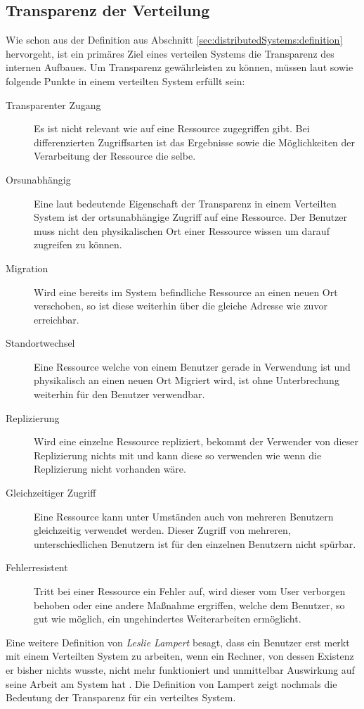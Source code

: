 \subsection{Transparenz der Verteilung}\label{sec:distributedSystems:goales:Transperency} Wie schon aus der Definition aus Abschnitt \ref{sec:distributedSystems:definition} hervorgeht, ist ein primäres Ziel eines verteilen Systems die Transparenz des internen Aufbaues. Um Transparenz gewährleisten zu können, müssen laut \cite{iec1995open} sowie \cite{tanenbaum2007distributed} folgende Punkte in einem verteilten System erfüllt sein:
\begin{description}
    \item[Transparenter Zugang] Es ist nicht relevant wie auf eine Ressource zugegriffen gibt. Bei differenzierten Zugriffsarten ist das Ergebnisse sowie die Möglichkeiten der Verarbeitung der Ressource die selbe. 
    \item[Orsunabhängig] Eine laut \cite{tanenbaum2007distributed} bedeutende Eigenschaft der Transparenz in einem Verteilten System ist der ortsunabhängige Zugriff auf eine Ressource. Der Benutzer muss nicht den physikalischen Ort einer Ressource wissen um darauf zugreifen zu können. 
    \item[Migration] Wird eine bereits im System befindliche Ressource an einen neuen Ort verschoben, so ist diese weiterhin über die gleiche Adresse wie zuvor erreichbar.
    \item [Standortwechsel] Eine Ressource welche von einem Benutzer gerade in Verwendung ist und physikalisch an einen neuen Ort Migriert wird, ist ohne Unterbrechung weiterhin für den Benutzer verwendbar.
    \item[Replizierung] Wird eine einzelne Ressource repliziert, bekommt der Verwender von dieser Replizierung nichts mit und kann diese so verwenden wie wenn die Replizierung nicht vorhanden wäre. 
    \item[Gleichzeitiger Zugriff] Eine Ressource kann unter Umständen auch von mehreren Benutzern gleichzeitig verwendet werden. Dieser Zugriff von mehreren, unterschiedlichen Benutzern ist für den einzelnen Benutzern nicht spürbar.
    \item[Fehlerresistent] Tritt bei einer Ressource ein Fehler auf, wird dieser vom User verborgen behoben oder eine andere Maßnahme ergriffen, welche dem Benutzer, so gut wie möglich, ein ungehindertes Weiterarbeiten ermöglicht.
\end{description}
Eine weitere Definition von \textit{Leslie Lampert} besagt, dass ein Benutzer erst merkt mit einem Verteilten System zu arbeiten, wenn ein Rechner, von dessen Existenz er bisher nichts wusste, nicht mehr funktioniert und unmittelbar Auswirkung auf seine Arbeit am System hat \citep{Schroeder:1993}. Die Definition von Lampert zeigt nochmals die Bedeutung der Transparenz für ein verteiltes System. \\
